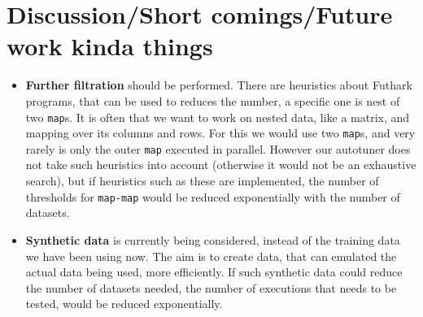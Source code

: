 \section{Discussion/Short comings/Future work kinda things}
\begin{comment}
The autotuner we have reach, does what it is supposed to do. However there are
some issues. To actually tune a program, it can be slower than the current
autotuner. It is slower on larger number of datasets, and that is due to ours
using an exhaustive search, of all possible combinations, this means that, in
the worst-case, we need to test $execution \; paths^{\# \; of \; datasets}$
number of executions, and that can obviously take quite a bit of time. While in
the case of a single, or a few datasets, our can be just as fast, or even
faster, due to the use of hill-climbing techniques, used in the previous
autotuner. 

This leads us into reliability. The previous tuner was not guaranteed to
produce the optimal result, in could get stuck in a local minimum. This happens
often enough for it to be a problem, whereas ours will always give the optimal
answer. 

While using an exhaustive search is reliable, it still has the problem of the
many executions to test. We will briefly describe two methods, to reduce the
number.
\end{comment}
\begin{itemize}
	\item \textbf{Further filtration} should be performed. There are heuristics
    about Futhark programs, that can be used to reduces the number, a specific
    one is nest of two \texttt{map}s. It is often that we want to work on
    nested data, like a matrix, and mapping over its columns and rows. For this
    we would use two \texttt{map}s, and very rarely is only the outer
    \texttt{map} executed in parallel. However our autotuner does not take such
    heuristics into account (otherwise it would not be an exhaustive search),
    but if heuristics such as these are implemented, the number of thresholds
    for \texttt{map-map} would be reduced exponentially with the number of
    datasets.
	\item \textbf{Synthetic data} is currently being considered, instead of the
    training data we have been using now. The aim is to create data, that can
    emulated the actual data being used, more efficiently. If such synthetic
    data could reduce the number of datasets needed, the number of executions
    that needs to be tested, would be reduced exponentially.	
\end{itemize}


